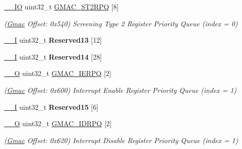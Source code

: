 \begin{DoxyCompactItemize}
\mbox{\hyperlink{core__cm7_8h_aec43007d9998a0a0e01faede4133d6be}{\+\_\+\+\_\+\+IO}} uint32\+\_\+t \mbox{\hyperlink{structGmac_accb0bb12cfd6251eb2f91c8fb24618fc}{G\+M\+A\+C\+\_\+\+S\+T2\+R\+PQ}} \mbox{[}8\mbox{]}
\begin{DoxyCompactList}\small\item\em (\mbox{\hyperlink{structGmac}{Gmac}} Offset\+: 0x540) Screening Type 2 Register Priority Queue (index = 0) \end{DoxyCompactList}\item 
\mbox{\label{structGmac_ad8cf4ba7d4b60c25cbe0d5d33d789243}} 
\mbox{\hyperlink{core__cm7_8h_af63697ed9952cc71e1225efe205f6cd3}{\+\_\+\+\_\+I}} uint32\+\_\+t {\bfseries Reserved13} \mbox{[}12\mbox{]}
\item 
\mbox{\label{structGmac_adee84f01952f0f4fad9a1241971622df}} 
\mbox{\hyperlink{core__cm7_8h_af63697ed9952cc71e1225efe205f6cd3}{\+\_\+\+\_\+I}} uint32\+\_\+t {\bfseries Reserved14} \mbox{[}28\mbox{]}
\item 
\mbox{\label{structGmac_ad82cc88ed89515b80d9bdf806addf105}} 
\mbox{\hyperlink{core__cm7_8h_a7e25d9380f9ef903923964322e71f2f6}{\+\_\+\+\_\+O}} uint32\+\_\+t \mbox{\hyperlink{structGmac_ad82cc88ed89515b80d9bdf806addf105}{G\+M\+A\+C\+\_\+\+I\+E\+R\+PQ}} \mbox{[}2\mbox{]}
\begin{DoxyCompactList}\small\item\em (\mbox{\hyperlink{structGmac}{Gmac}} Offset\+: 0x600) Interrupt Enable Register Priority Queue (index = 1) \end{DoxyCompactList}\item 
\mbox{\label{structGmac_aa9913257c25c6993cb843e402ef12913}} 
\mbox{\hyperlink{core__cm7_8h_af63697ed9952cc71e1225efe205f6cd3}{\+\_\+\+\_\+I}} uint32\+\_\+t {\bfseries Reserved15} \mbox{[}6\mbox{]}
\item 
\mbox{\label{structGmac_a55a028406928145a3f3f49f5daa0f6c2}} 
\mbox{\hyperlink{core__cm7_8h_a7e25d9380f9ef903923964322e71f2f6}{\+\_\+\+\_\+O}} uint32\+\_\+t \mbox{\hyperlink{structGmac_a55a028406928145a3f3f49f5daa0f6c2}{G\+M\+A\+C\+\_\+\+I\+D\+R\+PQ}} \mbox{[}2\mbox{]}
\begin{DoxyCompactList}\small\item\em (\mbox{\hyperlink{structGmac}{Gmac}} Offset\+: 0x620) Interrupt Disable Register Priority Queue (index = 1) \end{DoxyCompactList}\item 

\end{DoxyCompactItemize}
